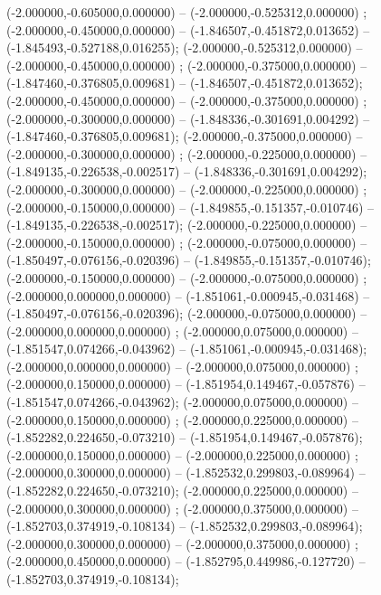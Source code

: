  (-2.000000,-0.605000,0.000000) -- (-2.000000,-0.525312,0.000000) ;
 (-2.000000,-0.450000,0.000000) -- (-1.846507,-0.451872,0.013652) -- (-1.845493,-0.527188,0.016255);
 (-2.000000,-0.525312,0.000000) -- (-2.000000,-0.450000,0.000000) ;
 (-2.000000,-0.375000,0.000000) -- (-1.847460,-0.376805,0.009681) -- (-1.846507,-0.451872,0.013652);
 (-2.000000,-0.450000,0.000000) -- (-2.000000,-0.375000,0.000000) ;
 (-2.000000,-0.300000,0.000000) -- (-1.848336,-0.301691,0.004292) -- (-1.847460,-0.376805,0.009681);
 (-2.000000,-0.375000,0.000000) -- (-2.000000,-0.300000,0.000000) ;
 (-2.000000,-0.225000,0.000000) -- (-1.849135,-0.226538,-0.002517) -- (-1.848336,-0.301691,0.004292);
 (-2.000000,-0.300000,0.000000) -- (-2.000000,-0.225000,0.000000) ;
 (-2.000000,-0.150000,0.000000) -- (-1.849855,-0.151357,-0.010746) -- (-1.849135,-0.226538,-0.002517);
 (-2.000000,-0.225000,0.000000) -- (-2.000000,-0.150000,0.000000) ;
 (-2.000000,-0.075000,0.000000) -- (-1.850497,-0.076156,-0.020396) -- (-1.849855,-0.151357,-0.010746);
 (-2.000000,-0.150000,0.000000) -- (-2.000000,-0.075000,0.000000) ;
 (-2.000000,0.000000,0.000000) -- (-1.851061,-0.000945,-0.031468) -- (-1.850497,-0.076156,-0.020396);
 (-2.000000,-0.075000,0.000000) -- (-2.000000,0.000000,0.000000) ;
 (-2.000000,0.075000,0.000000) -- (-1.851547,0.074266,-0.043962) -- (-1.851061,-0.000945,-0.031468);
 (-2.000000,0.000000,0.000000) -- (-2.000000,0.075000,0.000000) ;
 (-2.000000,0.150000,0.000000) -- (-1.851954,0.149467,-0.057876) -- (-1.851547,0.074266,-0.043962);
 (-2.000000,0.075000,0.000000) -- (-2.000000,0.150000,0.000000) ;
 (-2.000000,0.225000,0.000000) -- (-1.852282,0.224650,-0.073210) -- (-1.851954,0.149467,-0.057876);
 (-2.000000,0.150000,0.000000) -- (-2.000000,0.225000,0.000000) ;
 (-2.000000,0.300000,0.000000) -- (-1.852532,0.299803,-0.089964) -- (-1.852282,0.224650,-0.073210);
 (-2.000000,0.225000,0.000000) -- (-2.000000,0.300000,0.000000) ;
 (-2.000000,0.375000,0.000000) -- (-1.852703,0.374919,-0.108134) -- (-1.852532,0.299803,-0.089964);
 (-2.000000,0.300000,0.000000) -- (-2.000000,0.375000,0.000000) ;
 (-2.000000,0.450000,0.000000) -- (-1.852795,0.449986,-0.127720) -- (-1.852703,0.374919,-0.108134);
